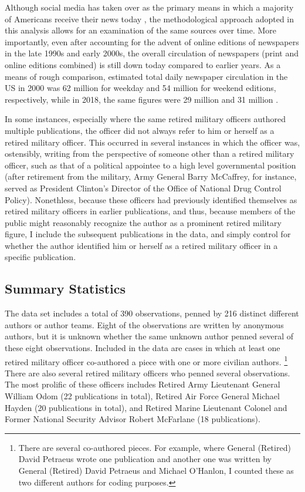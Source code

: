 \documentclass[12pt,]{article}
\begin{document}
Although social media has taken over as the primary means in which a majority of Americans receive their news today \autocite{martin_how_2018}, the methodological approach adopted in this analysis allows for an examination of the same sources over time. More importantly, even after accounting for the advent of online editions of newspapers in the late 1990s and early 2000s, the overall circulation of newspapers (print and online editions combined) is still down today compared to earlier years. As a means of rough comparison, estimated total daily newspaper circulation in the US in 2000 was 62 million for weekday and 54 million for weekend editions, respectively, while in 2018, the same figures were 29 million and 31 million \autocite{barthel_leading_2019}.

In some instances, especially where the same retired military officers authored multiple publications, the officer did not always refer to him or herself as a retired military officer. This occurred in several instances in which the officer was, ostensibly, writing from the perspective of someone other than a retired military officer, such as that of a political appointee to a high level governmental position (after retirement from the military, Army General Barry McCaffrey, for instance, served as President Clinton's Director of the Office of National Drug Control Policy). Nonethless, because these officers had previously identified themselves as retired military officers in earlier publications, and thus, because members of the public might reasonably recognize the author as a prominent retired military figure, I include the subsequent publications in the data, and simply control for whether the author identified him or herself as a retired military officer in a specific publication.

\hypertarget{summary-statistics}{%
\subsection{Summary Statistics}\label{summary-statistics}}

The data set includes a total of 390 observations, penned by 216 distinct different authors or author teams. Eight of the observations are written by anonymous authors, but it is unknown whether the same unknown author penned several of these eight observations. Included in the data are cases in which at least one retired military officer co-authored a piece with one or more civilian authors. \footnote{There are several co-authored pieces. For example, where General (Retired) David Petraeus wrote one publication and another one was written by General (Retired) David Petraeus and Michael O'Hanlon, I counted these as two different authors for coding purposes.} There are also several retired military officers who penned several observations. The most prolific of these officers includes Retired Army Lieutenant General William Odom (22 publications in total), Retired Air Force General Michael Hayden (20 publications in total), and Retired Marine Lieutenant Colonel and Former National Security Advisor Robert McFarlane (18 publications).
\end{document}
